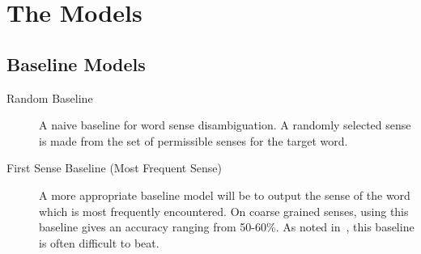 \documentclass[12pt,letterpaper]{article}
\newcommand{\blue}[1]{\textcolor{RoyalBlue}{#1}}
\newcommand{\instructions}[1]{\blue{\textit{#1}}}
\begin{document}
\section{The Models}
\label{sec:models}

\subsection{Baseline Models}
\label{sec:baseline-models}
\begin{description}
\item[Random Baseline] A naive baseline for word sense disambiguation. A randomly selected sense is made from the set of permissible senses for the target word. \\
\item[First Sense Baseline (Most Frequent Sense)] A more appropriate baseline model will be to output the sense of the word which is most frequently encountered. On coarse grained senses, using this baseline gives an accuracy ranging from 50-60\%. As noted in~\cite{navigli2009word}, this baseline is often difficult to beat.
\end{description}
%
\end{document}
